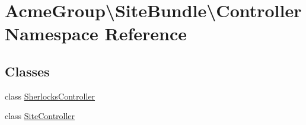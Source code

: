 \hypertarget{namespace_acme_group_1_1_site_bundle_1_1_controller}{\section{Acme\+Group\textbackslash{}Site\+Bundle\textbackslash{}Controller Namespace Reference}
\label{namespace_acme_group_1_1_site_bundle_1_1_controller}
}
\subsection*{Classes}
\begin{DoxyCompactItemize}
\item 
class \hyperlink{class_acme_group_1_1_site_bundle_1_1_controller_1_1_sherlocks_controller}{Sherlocks\+Controller}
\item 
class \hyperlink{class_acme_group_1_1_site_bundle_1_1_controller_1_1_site_controller}{Site\+Controller}
\end{DoxyCompactItemize}
